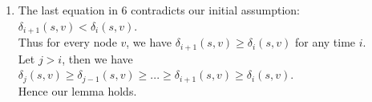 \documentclass[11pt]{article}
\begin{document}
\begin{enumerate}
    \item The last equation in 6 contradicts our initial assumption: $\delta_{i+1}(s,v) < \delta_{i}(s,v)$.\\
    Thus for every node $v$, we have $\delta_{i+1}(s,v) \geq \delta_{i}(s,v)$ for any time $i$.\\
    Let $j > i$, then we have $\delta_{j}(s,v) \geq \delta_{j-1}(s,v) \geq ... \geq \delta_{i+1}(s,v) \geq \delta_{i}(s,v)$.\\
    Hence our lemma holds.
    
\end{enumerate}
\end{document}
